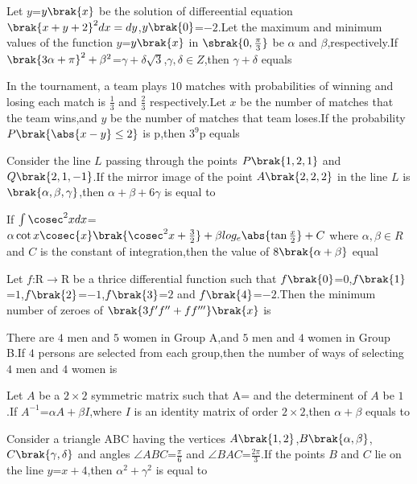 \iffalse
\title{27-jan-2024 shift-2}
\author{EE24BTECH11060}
\section{integer}
\fi
 \item Let $y$=$y\brak{x}$ be the solution of differeential equation $\brak{x+y+2}^2dx=dy$,$y\brak{0}$=$-2$.Let the maximum and minimum values of the function $y$=$y\brak{x}$ in $\sbrak{0,\frac{\pi}{3}}$ be $\alpha$ and $\beta$,respectively.If $\brak{3\alpha+\pi}^2+\beta^2$=$\gamma+\delta\sqrt{3}$,$\gamma,\delta \in Z$,then $\gamma+\delta$ equals
    \item In the tournament, a team plays $10$ matches with probabilities of winning and losing each match is $\frac{1}{3}$ and $\frac{2}{3}$ respectively.Let $x$ be the number of matches that the team wins,and $y$ be the number of matches that team loses.If the probability $P\brak{\abs{x-y} \leq 2}$ is p,then $3^9$p equals
    \item Consider the line $L$ passing through the points $P\brak{1,2,1}$ and $Q\brak{2,1,-1}$.If the mirror image of the point $A\brak{2,2,2}$ in the line $L$ is $\brak{\alpha,\beta,\gamma}$,then $\alpha+\beta+6\gamma$ is equal to
    \item If $\int\cosec^2{x}dx$=$\alpha\cot{x}\cosec{x}\brak{\cosec^2{x}+\frac{3}{2}}+\beta log_e\abs{\tan{\frac{x}{2}}}+C$ where $\alpha,\beta \in R$ and $C$ is the constant of integration,then the value of $8\brak{\alpha+\beta}$ equal
    \item Let $f$:R$\to$R be a thrice differential function such that $f\brak{0}$=$0$,$f\brak{1}$=$1$,$f\brak{2}$=$-1$,$f\brak{3}$=$2$ and $f\brak{4}$=$-2$.Then the minimum number of zeroes of $\brak{3f^{\prime}f^{\prime\prime}+ff^{\prime\prime\prime}}\brak{x}$ is 
    \item There are $4$ men and $5$ women in Group A,and $5$ men and $4$ women in Group B.If $4$ persons are selected from each group,then the number of ways of selecting $4$ men and $4$ women is
    \item Let $A$ be a $2\times2$ symmetric matrix such that A= and the determinent of $A$ be $1$.If $A^{-1}$=$\alpha A+\beta I$,where $I$ is an identity matrix of order $2\times2$,then $\alpha+\beta$ equals to
    \item Consider a triangle ABC having the vertices $A\brak{1,2}$,$B\brak{\alpha,\beta}$,$C\brak{\gamma,\delta}$ and angles $\angle ABC$=$\frac{\pi}{6}$ and $\angle BAC$=$\frac{2\pi}{3}$.If the points $B$ and $C$ lie on the line $y$=$x+4$,then $\alpha^2+\gamma^2$ is equal to
